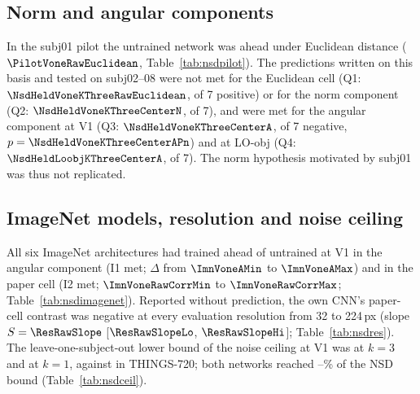 \subsection{Norm and angular components}
\label{sec:nsdcomponents}
In the subj01 pilot the untrained network was ahead under Euclidean distance ($\PilotVoneRawEuclidean$,
Table~\ref{tab:nsdpilot}). The predictions written on this basis and tested on subj02--08 were not met for
the Euclidean cell (Q1: $\NsdHeldVoneKThreeRawEuclidean$, \NsdHeldVoneKThreeRawEuclideanPos{} of 7
positive) or for the norm component (Q2: $\NsdHeldVoneKThreeCenterN$, \NsdHeldVoneKThreeCenterNPos{} of 7),
and were met for the angular component at V1 (Q3: $\NsdHeldVoneKThreeCenterA$,
\NsdHeldVoneKThreeCenterANeg{} of 7 negative, $p = \NsdHeldVoneKThreeCenterAPn$) and at LO-obj (Q4:
$\NsdHeldLoobjKThreeCenterA$, \NsdHeldLoobjKThreeCenterANeg{} of 7). The norm hypothesis motivated by subj01
was thus not replicated.

\subsection{ImageNet models, resolution and noise ceiling}
\label{sec:nsdceiling}
All six ImageNet architectures had trained ahead of untrained at V1 in the angular component (I1 met;
$\Delta$ from $\ImnVoneAMin$ to $\ImnVoneAMax$) and in the paper cell (I2 met; $\ImnVoneRawCorrMin$ to
$\ImnVoneRawCorrMax$; Table~\ref{tab:nsdimagenet}). Reported without prediction, the own CNN's paper-cell
contrast was negative at every evaluation resolution from 32 to 224\,px (slope
$S = \ResRawSlope$ [$\ResRawSlopeLo$, $\ResRawSlopeHi$]; Table~\ref{tab:nsdres}). The leave-one-subject-out
lower bound of the noise ceiling at V1 was \CeilVoneKThree{} at $k = 3$ and \CeilVoneKOne{} at $k = 1$,
against \CeilThingsLoso{} in THINGS-720; both networks reached \CeilVoneFracMin--\CeilVoneFracMax\% of the
NSD bound (Table~\ref{tab:nsdceil}).
